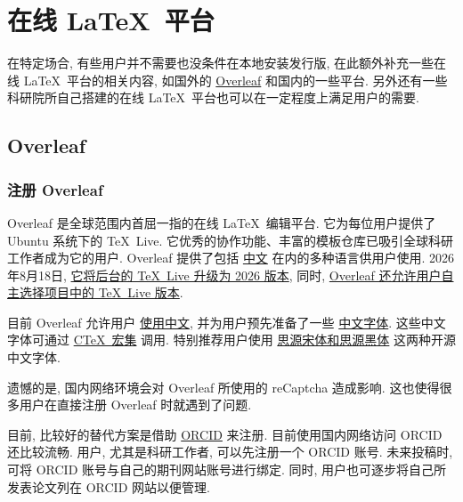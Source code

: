 
\chapter{在线 \LaTeX\ 平台}

在特定场合,
有些用户并不需要也没条件在本地安装发行版,
在此额外补充一些在线 \LaTeX\ 平台的相关内容,
如国外的 \href{https://www.overleaf.com/}{Overleaf} 和国内的一些平台.
另外还有一些科研院所自己搭建的在线 \LaTeX\ 平台也可以在一定程度上满足用户的需要.

\section{Overleaf}

\subsection{注册 Overleaf}

Overleaf 是全球范围内首屈一指的在线 \LaTeX\ 编辑平台.
它为每位用户提供了 Ubuntu 系统下的 \TeX~Live.
它优秀的协作功能、丰富的模板仓库已吸引全球科研工作者成为它的用户.
Overleaf 提供了包括%
\href{https://cn.overleaf.com/}{中文}%
在内的多种语言供用户使用.
2026年8月18日,
\href{https://www.overleaf.com/blog/tex-live-2026-is-now-available}{它将后台的 \TeX~Live 升级为 2026 版本},
同时,
\href{https://www.overleaf.com/blog/new-feature-select-your-tex-live-compiler-version}{Overleaf 还允许用户自主选择项目中的 \TeX~Live 版本}.

目前 Overleaf 允许用户%
\href{https://www.overleaf.com/learn/latex/Chinese}{使用中文},
并为用户预先准备了一些%
\href{https://www.overleaf.com/learn/latex/Questions/Which_OTF_or_TTF_fonts_are_supported_via_fontspec%3F#Fonts_for_CJK}{中文字体}.
这些中文字体可通过%
\href{https://www.overleaf.com/latex/templates/using-the-ctex-package-on-overleaf-zai-overleafping-tai-shang-shi-yong-ctex/gndvpvsmjcqx}{C\TeX\ 宏集}%
调用.
特别推荐用户使用%
\href{https://www.overleaf.com/latex/examples/demonstration-of-noto-serif-cjk-and-noto-sans-cjk-fonts/sgrwgcddtqsq}{思源宋体和思源黑体}%
这两种开源中文字体.

遗憾的是,
国内网络环境会对 Overleaf 所使用的 reCaptcha 造成影响.
这也使得很多用户在直接注册 Overleaf 时就遇到了问题.

目前,
比较好的替代方案是借助 \href{https://orcid.org/}{ORCID} 来注册.
目前使用国内网络访问 ORCID 还比较流畅.
用户, 尤其是科研工作者, 可以先注册一个 ORCID 账号.
未来投稿时,
可将 ORCID 账号与自己的期刊网站账号进行绑定.
同时,
用户也可逐步将自己所发表论文列在 ORCID 网站以便管理.

